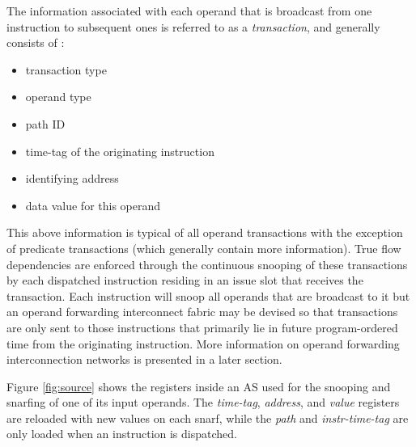 \documentclass{book}
\begin{document}
The information associated with each operand that is
broadcast from one instruction to subsequent ones
is referred
to as a {\em transaction}, and generally consists of :
%
\begin{itemize}
\vspace{-0.10in}
\item{transaction type}
\vspace{-0.10in}
\item{operand type}
\vspace{-0.10in}
\item{path ID}
\vspace{-0.10in}
\item{time-tag of the originating instruction}
\vspace{-0.10in}
\item{identifying address}
\vspace{-0.10in}
\item{data value for this operand}
\vspace{-0.10in}
\end{itemize}   
%
This above information is typical of all operand transactions
with the exception of predicate transactions (which generally
contain more information).
True flow dependencies are enforced through the continuous snooping of
these transactions by each dispatched instruction residing in an issue
slot that receives the transaction.
Each instruction
will snoop all operands that are broadcast to it but
an operand forwarding interconnect fabric may be devised so that
transactions are only sent to those instructions that primarily
lie in future program-ordered time from the originating instruction.  
More information on operand forwarding interconnection networks
is presented in a later section.

Figure \ref{fig:source} shows the registers inside an 
AS used for the snooping and snarfing of 
one of its input operands.  
The 
{\em time-tag},
{\em address}, and
{\em value} registers are reloaded with new values on each snarf,
while the
{\em path} and
{\em instr-time-tag} are only loaded when an instruction is
dispatched.
%
\begin{figure*}
\centerline{}
\caption[Operand snooping]
{{\em Operand snooping.} 
The registers and snooping
operation of one of several possible source operands is shown.
Just one operand forwarding bus is shown being snooped but
typically several operand forwarding buses are snooped simultaneously.}
\label{fig:source}
\end{figure*}
%
\end{document}
